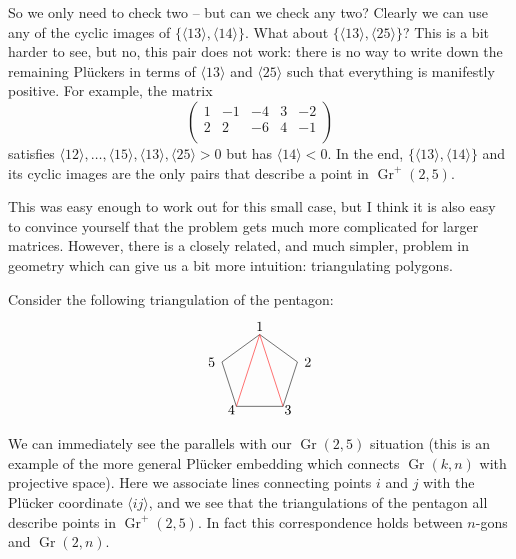 \documentclass[11pt]{article}
\DeclareMathOperator{\Gr}{Gr}
\def\ket#1{\langle #1 \rangle}
\def\drawLabeledPentagon{
\coordinate (P1) at (90:1);
\coordinate (P2) at (18:1);
\coordinate (P3) at (306:1);
\coordinate (P4) at (234:1);
\coordinate (P5) at (162:1);
\draw (P1) -- (P2) -- (P3) -- (P4) -- (P5) -- cycle;
\draw (0,1.2) node {1};
\draw (1,.3) node[anchor=west] {2};
\draw (.5,-.9) node[anchor=west] {3};
\draw (-.5,-.9) node[anchor=east] {4};
\draw (-1,.3) node[anchor=east] {5};
}
\begin{document}
So we only need to check two -- but can we check any two? Clearly we can use any of the cyclic images of $\{\ket{13}, \ket{14}\}$. What about $\{\ket{13}, \ket{25}\}$? This is a bit harder to see, but no, this pair does not work: there is no way to write down the remaining Pl\"uckers in terms of $\ket{13}$ and $\ket{25}$ such that everything is manifestly positive. For example, the matrix
\begin{equation}
\left(
\begin{array}{ccccc}
 1 & -1 & -4 & 3 & -2 \\
 2 & 2 & -6 & 4 & -1 \\
\end{array}
\right)
\end{equation}
satisfies $\ket{12},\ldots,\ket{15},\ket{13},\ket{25}>0$ but has $\ket{14}<0$. In the end, $\{\ket{13}, \ket{14}\}$ and its cyclic images are the only pairs that describe a point in $\Gr^+(2,5)$. 

This was easy enough to work out for this small case, but I think it is also easy to convince yourself that the problem gets much more complicated for larger matrices. However, there is a closely related, and much simpler, problem in geometry which can give us a bit more intuition: triangulating polygons.

Consider the following triangulation of the pentagon:
\begin{equation}
\begin{tikzpicture}
  \drawLabeledPentagon
  \draw[color=red] (P1) -- (P3);
  \draw[color=red] (P1) -- (P4);
\end{tikzpicture}
\end{equation}
We can immediately see the parallels with our $\Gr(2,5)$ situation (this is an example of the more general Pl\"ucker embedding which connects $\Gr(k,n)$ with projective space). Here we associate lines connecting points $i$ and $j$ with the Pl\"ucker coordinate $\ket{ij}$, and we see that the triangulations of the pentagon all describe points in $\Gr^+(2,5)$. In fact this correspondence holds between $n$-gons and $\Gr(2,n)$. 
\end{document}
